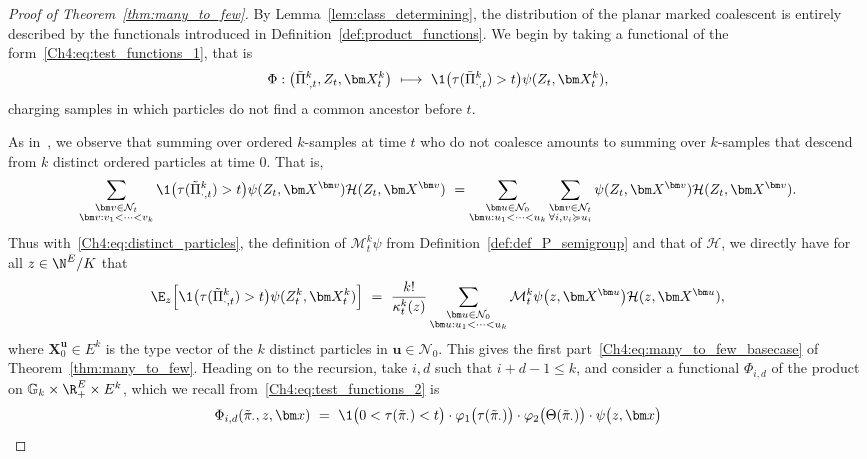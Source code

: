 \begin{refsegment}
\begin{proof}[Proof of Theorem~\ref{thm:many_to_few}]
By Lemma~\ref{lem:class_determining}, the distribution of the planar marked coalescent is entirely described by the functionals introduced in Definition~\ref{def:product_functions}.
We begin by taking a functional of the form~\eqref{Ch4:eq:test_functions_1}, that is
\[
 \Phi:\big(\tilde{\Pi}^k_{\cdot,t},   Z_t, \bm X^k_t\big)\ \longmapsto\ \1\big(\tau(\tilde\Pi^k_{\cdot,t})> t\big)\psi(Z_t, \bm X^k_t), 
 \]
 charging samples in which  particles do not find a common ancestor before $t$.

As in~\cite{AFRS_2025}, we observe that summing over ordered $k$-samples at time $t$ who do not coalesce amounts to summing over $k$-samples that descend from $k$ distinct ordered particles at time $0$. That is,
\begin{multline*}
\sum_{\substack{\bm v\in\mathcal{N}_t\\  \bm v:v_1<\cdots<v_k}}\1\big(\tau(\tilde\Pi^k_{\cdot,t}) > t\big)\psi(Z_t,\bm X^{\bm v}) \mathcal H(Z_t, \bm X^{\bm v})
 \ =
 \sum_{\substack{\bm u\in\mathcal{N}_0\\ \bm u:u_1<\cdots<u_k}} \sum_{\substack{\bm v\in\mathcal{N}_t\\ \forall i, v_i \succcurlyeq u_i}} \psi(Z_t,\bm X^{\bm v})\mathcal H(Z_t, \bm X^{\bm v}).
\end{multline*}
Thus with~\eqref{Ch4:eq:distinct_particles}, the definition of $\mathcal{M}^k_t\psi$ from Definition~\ref{def:def_P_semigroup} and that of $\mathcal{H}$, we directly have for all $z\in \N^E/K$ that
\begin{equation} \label{Ch4:eq:basecase}
 \E_{z}\Big[\1\big(\tau(\tilde\Pi^k_{\cdot,t}) > t\big)\psi(Z^k_t, \bm X^k_t)\Big]\ =\ \frac{k!}{\kappa^k_{t}(z)}\sum_{\substack{\bm u\in\mathcal{N}_0\\ \bm u:u_1<\cdots<u_k}} \mathcal{M}^k_t\psi\big(z, \bm X^{\bm u}\big)\mathcal{H}(z,\bm X^{\bm u}),
\end{equation}
where $ \bm X^{\bm u}_0 \in E^k$ is the type vector of the $k$ distinct particles in $\bm u\in \mathcal N_0$.
This gives the first part~\eqref{Ch4:eq:many_to_few_basecase} of Theorem~\ref{thm:many_to_few}.
Heading on to the recursion, take $i,d$ such that $i+d-1\leq k$, and consider a functional $\Phi_{i,d}$ of the product on $\mathbb{G}_k\times \R_+^E \times E^k$, which we recall from~\eqref{Ch4:eq:test_functions_2} is
\begin{multline*}
\Phi_{i,d}(\tilde{\pi}_\cdot, z,\bm x)\ =\ \1\big(0<\tau(\tilde\pi_\cdot)< t\big)
\cdot \varphi_1\big(\tau(\tilde\pi_\cdot)\big)\cdot\varphi_2\big(\Theta(\tilde{\pi}_\cdot)\big)\cdot \psi\big(z, \bm x\big)\\

\end{multline*}
\end{proof}
\end{refsegment}
